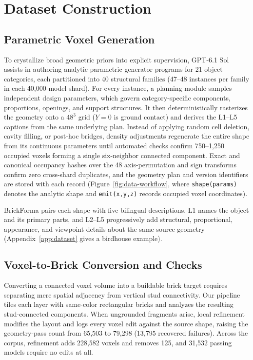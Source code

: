 \section{Dataset Construction}
\label{sec:dataset}
\subsection{Parametric Voxel Generation}
To crystallize broad geometric priors into explicit supervision, GPT-6.1 Sol assists in authoring analytic parametric generator programs for 21 object categories, each partitioned into 40 structural families (47--48 instances per family in each 40,000-model shard). For every instance, a planning module samples independent design parameters, which govern category-specific components, proportions, openings, and support structures. It then deterministically rasterizes the geometry onto a $48^3$ grid ($Y{=}0$ is ground contact) and derives the L1--L5 captions from the same underlying plan. Instead of applying random cell deletion, cavity filling, or post-hoc bridges, density adjustments regenerate the entire shape from its continuous parameters until automated checks confirm 750--1,250 occupied voxels forming a single six-neighbor connected component. Exact and canonical occupancy hashes over the 48 axis-permutation and sign transforms confirm zero cross-shard duplicates, and the geometry plan and version identifiers are stored with each record (Figure~\ref{fig:data-workflow}, where \texttt{shape(params)} denotes the analytic shape and \texttt{emit(x,y,z)} records occupied voxel coordinates).

BrickForma pairs each shape with five bilingual descriptions. L1 names the object and its primary parts, and L2--L5 progressively add structural, proportional, appearance, and viewpoint details about the same source geometry (Appendix~\ref{app:dataset} gives a birdhouse example).

\subsection{Voxel-to-Brick Conversion and Checks}
Converting a connected voxel volume into a buildable brick target requires separating mere spatial adjacency from vertical stud connectivity. Our pipeline tiles each layer with same-color rectangular bricks and analyzes the resulting stud-connected components. When ungrounded fragments arise, local refinement modifies the layout and logs every voxel edit against the source shape, raising the geometry-pass count from 65,503 to 79,298 (13,795 recovered failures). Across the corpus, refinement adds 228,582 voxels and removes 125, and 31,532 passing models require no edits at all.

